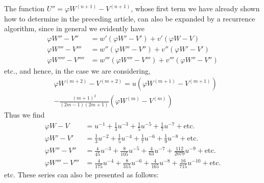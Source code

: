 The function $U''=\varphi W^{(n+1)}-V^{(n+1)}$, whose first term we have already shown how to determine in the preceding article, can also be expanded by a recurrence algorithm, since in general we evidently have
\[
\begin{aligned}
\varphi W''-V''&=w'(\varphi W'-V')+v'(\varphi W-V)\\
\varphi W'''-V'''&=w''(\varphi W''-V'')+v''(\varphi W'-V')\\
\varphi W''''-V''''&=w'''(\varphi W'''-V''')+v'''(\varphi W''-V'')
\end{aligned}
\]
etc., and hence, in the case we are considering,
\[
\begin{aligned}&\varphi W^{(m+2)}-V^{(m+2)}=u(\varphi W^{(m+1)}-V^{(m+1)})\\[5pt]&-\frac{(m+1)^2}{(2m-1)(2m+1)}(\varphi W^{(m)}-V^{(m)})\end{aligned}
\]
Thus we find
\[
\begin{aligned}
\varphi W-V&=u^{-1}+\tfrac13u^{-3}+\tfrac15u^{-5}+\tfrac17u^{-7}+\text{etc.}\\
\varphi W'-V'&=\tfrac13u^{-2}+\tfrac15u^{-4}+\tfrac17u^{-6}+\tfrac19u^{-8}+\text{etc.}\\
\varphi W''-V''&=\tfrac4{45}u^{-3}+\tfrac8{105}u^{-5}+\tfrac4{63}u^{-7}+\tfrac{112}{2079}u^{-9}+\text{etc.}\\
\varphi W'''-V'''&=\tfrac4{175}u^{-4}+\tfrac8{315}u^{-6}+\tfrac4{165}u^{-8}+\tfrac{16}{715}u^{-10}+\text{etc.}
\end{aligned}
\]
etc. These series can also be presented as follows:
